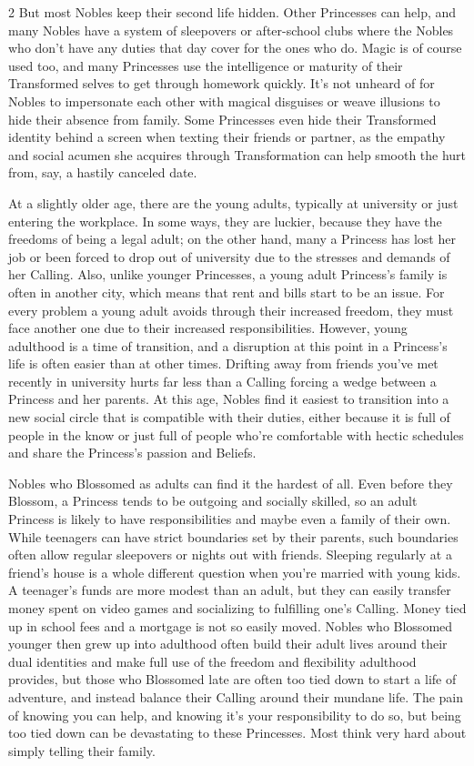 \begin{multicols}{2}
But most Nobles keep their second life hidden. Other Princesses can help, and many Nobles have a system of sleepovers or after-school clubs where the Nobles who don't have any duties that day cover for the ones who do. Magic is of course used too, and many Princesses use the intelligence or maturity of their Transformed selves to get through homework quickly. It's not unheard of for Nobles to impersonate each other with magical disguises or weave illusions to hide their absence from family. Some Princesses even hide their Transformed identity behind a screen when texting their friends or partner, as the empathy and social acumen she acquires through Transformation can help smooth the hurt from, say, a hastily canceled date. 

At a slightly older age, there are the young adults, typically at university or just entering the workplace. In some ways, they are luckier, because they have the freedoms of being a legal adult; on the other hand, many a Princess has lost her job or been forced to drop out of university due to the stresses and demands of her Calling. Also, unlike younger Princesses, a young adult Princess's family is often in another city, which means that rent and bills start to be an issue. For every problem a young adult avoids through their increased freedom, they must face another one due to their increased responsibilities. However, young adulthood is a time of transition, and a disruption at this point in a Princess's life is often easier than at other times. Drifting away from friends you've met recently in university hurts far less than a Calling forcing a wedge between a Princess and her parents. At this age, Nobles find it easiest to transition into a new social circle that is compatible with their duties, either because it is full of people in the know or just full of people who're comfortable with hectic schedules and share the Princess's passion and Beliefs. 

Nobles who Blossomed as adults can find it the hardest of all. Even before they Blossom, a Princess tends to be outgoing and socially skilled, so an adult Princess is likely to have responsibilities and maybe even a family of their own. While teenagers can have strict boundaries set by their parents, such boundaries often allow regular sleepovers or nights out with friends. Sleeping regularly at a friend's house is a whole different question when you're married with young kids. A teenager's funds are more modest than an adult, but they can easily transfer money spent on video games and socializing to fulfilling one's Calling. Money tied up in school fees and a mortgage is not so easily moved. Nobles who Blossomed younger then grew up into adulthood often build their adult lives around their dual identities and make full use of the freedom and flexibility adulthood provides, but those who Blossomed late are often too tied down to start a life of adventure, and instead balance their Calling around their mundane life. The pain of knowing you can help, and knowing it's your responsibility to do so, but being too tied down can be devastating to these Princesses. Most think very hard about simply telling their family. 


\end{multicols}
